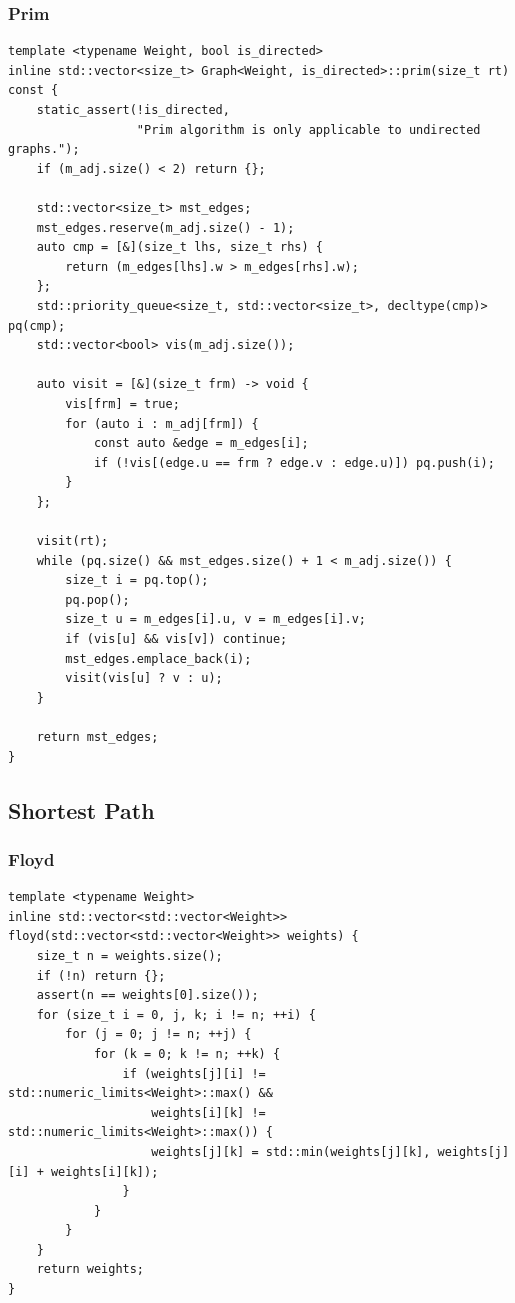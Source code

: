 \documentclass[UTF8]{article}
\begin{document}
\subsubsection{Prim}
\begin{verbatim}
template <typename Weight, bool is_directed>
inline std::vector<size_t> Graph<Weight, is_directed>::prim(size_t rt) const {
	static_assert(!is_directed,
				  "Prim algorithm is only applicable to undirected graphs.");
	if (m_adj.size() < 2) return {};

	std::vector<size_t> mst_edges;
	mst_edges.reserve(m_adj.size() - 1);
	auto cmp = [&](size_t lhs, size_t rhs) {
		return (m_edges[lhs].w > m_edges[rhs].w);
	};
	std::priority_queue<size_t, std::vector<size_t>, decltype(cmp)> pq(cmp);
	std::vector<bool> vis(m_adj.size());

	auto visit = [&](size_t frm) -> void {
		vis[frm] = true;
		for (auto i : m_adj[frm]) {
			const auto &edge = m_edges[i];
			if (!vis[(edge.u == frm ? edge.v : edge.u)]) pq.push(i);
		}
	};

	visit(rt);
	while (pq.size() && mst_edges.size() + 1 < m_adj.size()) {
		size_t i = pq.top();
		pq.pop();
		size_t u = m_edges[i].u, v = m_edges[i].v;
		if (vis[u] && vis[v]) continue;
		mst_edges.emplace_back(i);
		visit(vis[u] ? v : u);
	}

	return mst_edges;
}
\end{verbatim}

\subsection{Shortest Path}
\subsubsection{Floyd}
\begin{verbatim}
template <typename Weight>
inline std::vector<std::vector<Weight>>
floyd(std::vector<std::vector<Weight>> weights) {
	size_t n = weights.size();
	if (!n) return {};
	assert(n == weights[0].size());
	for (size_t i = 0, j, k; i != n; ++i) {
		for (j = 0; j != n; ++j) {
			for (k = 0; k != n; ++k) {
				if (weights[j][i] != std::numeric_limits<Weight>::max() &&
					weights[i][k] != std::numeric_limits<Weight>::max()) {
					weights[j][k] = std::min(weights[j][k], weights[j][i] + weights[i][k]);
				}
			}
		}
	}
	return weights;
}
\end{verbatim}
\end{document}
